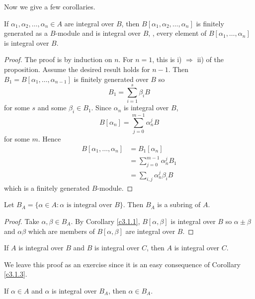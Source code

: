 Now we give a few corollaries.

\begin{coro}
\label{c3.1.1}
If $\alpha_{1}, \alpha_{2}, \ldots, \alpha_{n} \in A$ are integral over $B$, then $B[\alpha_{1}, \alpha_{2}, \ldots, \alpha_{n}]$ is finitely generated as a $B$-module and is integral over $B$, \ie, every element of $B[\alpha_{1}, \ldots, \alpha_{n}]$ is integral over $B$.
\end{coro}

\begin{proof}
The proof is by induction on $n$. For $n=1$, this is i) $\Rightarrow$ ii) of the proposition. Assume the desired result holds for $n-1$. Then $B_{1}=B[\alpha_{1},\ldots,\alpha_{n-1}]$ is finitely generated over $B$ so
$$
B_{1}=\sum_{i=1}^{s}\beta_{i}B
$$
for some $s$ and some $\beta_{i}\in B_{1}$. Since $\alpha_{n}$ is integral over $B$,
$$
B[\alpha_{n}]=\sum_{j=0}^{m-1}\alpha_{n}^{j}B
$$
for some $m$. Hence
\begin{align*}
B[\alpha_{1}, \ldots, \alpha_{n}]&=B_{1}[\alpha_{n}]\\
&=\sum_{j=0}^{m-1}\alpha_{n}^{j}B_{1}\\
&=\sum_{i,j}\alpha_{n}^{j}\beta_{i}B
\end{align*}
which is a finitely generated $B$-module.
\end{proof}

\begin{coro}
\label{c3.1.2}
Let $B_{A}=\{ \alpha \in A:\alpha\text{ is integral over }B\}$. Then $B_{A}$ is a subring of $A$.
\end{coro}

\begin{proof} Take $\alpha,\beta\in B_{A}$. By Corollary \ref{c3.1.1}, $B[\alpha, \beta]$ is integral over $B$ so $\alpha \pm\beta$ and $\alpha\beta$ which are members of $B[\alpha, \beta]$ are integral over $B$.
\end{proof}

\begin{coro}
\label{c3.1.3}
If $A$ is integral over $B$ and $B$ is integral over $C$, then $A$ is integral over $C$.
\end{coro}

We leave this proof as an exercise since it is an easy consequence of Corollary \ref{c3.1.3}.

\begin{coro}
\label{c3.1.4}
If $\alpha \in A$ and $\alpha$ is integral over $B_{A}$, then $\alpha \in B_{A}$.
\end{coro}

